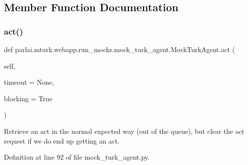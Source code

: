 \subsection{Member Function Documentation}
\mbox{\label{classparlai_1_1mturk_1_1webapp_1_1run__mocks_1_1mock__turk__agent_1_1MockTurkAgent_a102d5896e39d6f1262a7306241d76f49}} 
\subsubsection{\texorpdfstring{act()}{act()}}
{\footnotesize\ttfamily def parlai.\+mturk.\+webapp.\+run\+\_\+mocks.\+mock\+\_\+turk\+\_\+agent.\+Mock\+Turk\+Agent.\+act (\begin{DoxyParamCaption}\item[{}]{self,  }\item[{}]{timeout = {\ttfamily None},  }\item[{}]{blocking = {\ttfamily True} }\end{DoxyParamCaption})}

\begin{DoxyVerb}Retrieve an act in the normal expected way (out of the queue), but clear the act
request if we do end up getting an act.
\end{DoxyVerb}
 

Definition at line 92 of file mock\+\_\+turk\+\_\+agent.\+py.


